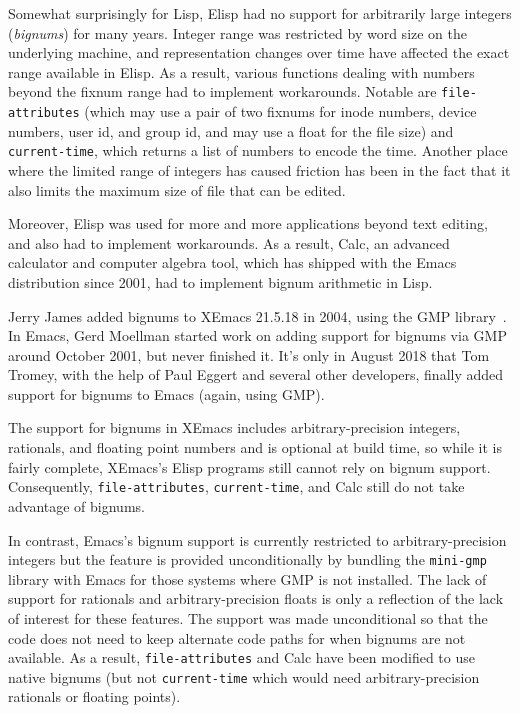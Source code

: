 \documentclass[format=acmsmall, review=false, screen=true]{acmart}
\newcommand \Elisp {Elisp}
\begin{document}
Somewhat surprisingly for Lisp, \Elisp{} had no support for
arbitrarily large integers (\emph{bignums}) for many years.
Integer range was restricted by word size on the underlying machine,
and representation changes over time have affected the exact range
available in \Elisp.
As a result, various functions dealing with numbers beyond the fixnum range
had to implement workarounds.  Notable are \texttt{file-attributes} (which
may use a pair of two fixnums for inode numbers, device numbers, user id,
and group id, and may use a float for the file size) and
\texttt{current-time}, which returns a list of numbers to encode the time.
Another place where the limited range of integers has caused friction has
been in the fact that it also limits the maximum size of file that can
be edited.

Moreover, \Elisp{} was used for more and more applications beyond
text editing, and also had to implement workarounds.  As a result,
Calc, an advanced calculator and computer algebra tool, which has
shipped with the Emacs distribution since 2001, had to implement
bignum arithmetic in Lisp.

Jerry James added bignums to XEmacs 21.5.18 in 2004, using the GMP
library~\cite{GMP}.  In Emacs, Gerd Moellman started work on adding support
for bignums via GMP around October 2001, but never finished it.  It's only
in August 2018 that Tom Tromey, with the help of Paul Eggert and several
other developers, finally added support for bignums to Emacs (again, using
GMP).

The support for bignums in XEmacs includes arbitrary-precision integers,
rationals, and floating point numbers and is optional at build time, so
while it is fairly complete, XEmacs's \Elisp{} programs still cannot rely on
bignum support.  Consequently, \texttt{file-attributes},
\texttt{current-time}, and Calc still do not take advantage of bignums.

In contrast, Emacs's bignum support is currently restricted to
arbitrary-precision integers but the feature is provided unconditionally by
bundling the \texttt{mini-gmp} library with Emacs for those systems where
GMP is not installed.  The lack of support for rationals and
arbitrary-precision floats is only a reflection of the lack of interest for
these features.  The support was made unconditional so that the code does
not need to keep alternate code paths for when bignums are not available.
As a result, \texttt{file-attributes} and Calc have been modified to use
native bignums (but not \texttt{current-time} which would need
arbitrary-precision rationals or floating points).
\end{document}
